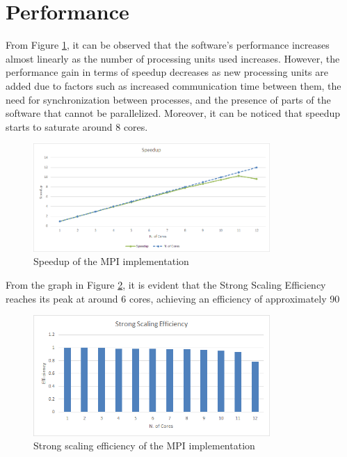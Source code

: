 \documentclass[a4paper, 12pt]{report}
\begin{document}
\section*{Performance}
\begin{sloppypar}
  \noindent
  From Figure \ref{fig:mpi_speedup}, it can be observed that the software's performance increases almost linearly as the number of processing units used increases. However, the performance gain in terms of speedup decreases as new processing units are added due to factors such as increased communication time between them, the need for synchronization between processes, and the presence of parts of the software that cannot be parallelized. Moreover, it can be noticed that speedup starts to saturate around 8 cores.

  \begin{figure}[ht]
    \centering
    \includegraphics[width=9cm]{img/mpi-speedup.png}
    \caption{Speedup of the MPI implementation}
    \label{fig:mpi_speedup}
  \end{figure}

  \noindent
  From the graph in Figure \ref{fig:mpi_sse}, it is evident that the Strong Scaling Efficiency reaches its peak at around 6 cores, achieving an efficiency of approximately 90%

  \begin{figure}[ht]
    \centering
    \includegraphics[width=9cm]{img/mpi-sse.png}
    \caption{Strong scaling efficiency of the MPI implementation}
    \label{fig:mpi_sse}
  \end{figure}


\end{sloppypar}
\end{document}
